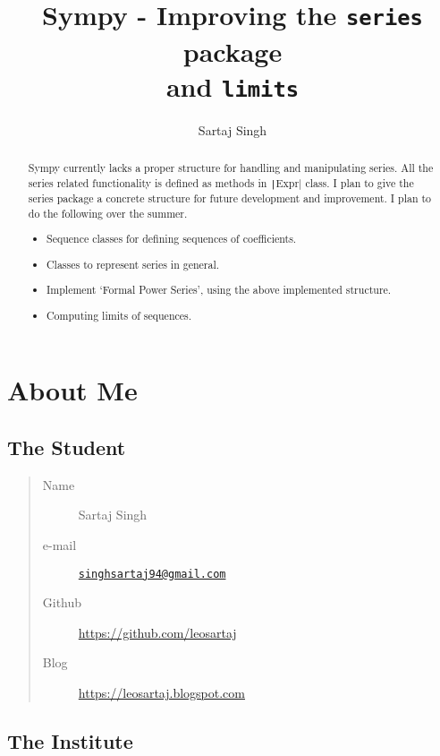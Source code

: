 \documentclass[a4paper,12pt]{article}
\title{Sympy - Improving the \texttt{series} package\hfill\\ and \texttt{limits}}
\author{Sartaj Singh}
\newcommand{\pyline}[1]{\texttt|#1|}
\begin{document}
\maketitle

\begin{abstract}

  Sympy currently lacks a proper structure for handling and
  manipulating series. All the series related functionality is defined
  as methods in \pyline{Expr} class. I plan to give the series package a
  concrete structure for future development and improvement. I plan to
  do the following over the summer.

  \begin{itemize}
    \item Sequence classes for defining sequences of coefficients.
    \item Classes to represent series in general.
    \item Implement `Formal Power Series', using the above implemented structure.
    \item Computing limits of sequences.
  \end{itemize}

\end{abstract}

\tableofcontents

\section{About Me}

\subsection*{The Student}

\begin{quote}
  \begin{description}
    \item [Name] {Sartaj Singh}
    \item [e-mail] {\href{mailto:singhsartaj94@gmail.com}
      {\nolinkurl{singhsartaj94@gmail.com}}}
    \item [Github] {\url{https://github.com/leosartaj}}
    \item [Blog] {\url{https://leosartaj.blogspot.com}}
  \end{description}
\end{quote}

\subsection*{The Institute}
\end{document}
